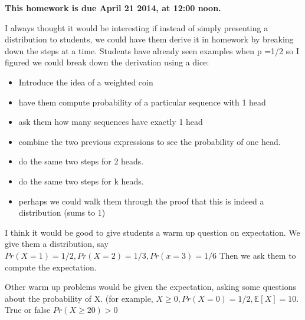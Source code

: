 \documentclass[]{article}
\begin{document}
\maketitle
{}
\vspace{0.5em}
{\Large{\textbf{This homework is due April 21 2014, at 12:00 noon.}}}

\begin{qunlist}
  

I always thought it would be interesting if instead of simply presenting a distribution to students, we could have them derive it in homework by breaking down the steps at a time. Students have already seen examples when p =1/2 so I figured we could break down the derivation using a dice:
\begin{itemize}
\item Introduce the idea of a weighted coin
\item have them compute probability of a particular sequence with 1 head
\item ask them how many sequences have exactly 1 head
\item combine the two previous expressions to see the probability of one head.
\item do the same two steps for 2 heads.
\item do the same two steps for k heads.
\item perhaps we could walk them through the proof that this is indeed a distribution (sums to 1)
\end{itemize}


 
 I think it would be good to give students a warm up question on expectation. We give them a distribution, say $Pr(X = 1) = 1/2, Pr (X=2) = 1/3, Pr (x=3) = 1/6$ Then we ask them to compute the expectation.
 
 Other warm up problems would be given the expectation, asking some questions about the probability of X. (for example, $X\geq 0, Pr(X=0) = 1/2, \mathbb{E}[X] = 10.$ True or false $Pr(X \geq 20) > 0$



\end{qunlist}
\end{document}
